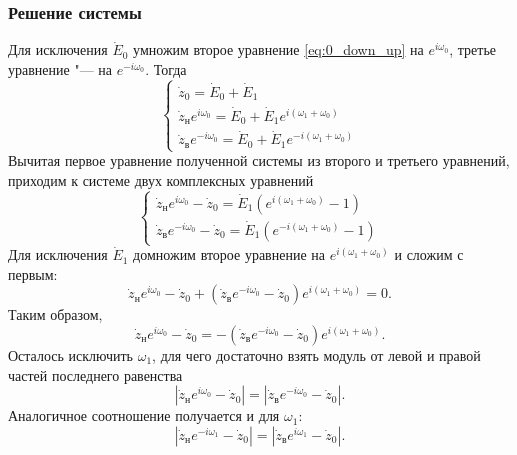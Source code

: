 \documentclass[../main.tex]{subfiles}
\begin{document}
\subsubsection{Решение системы}
Для исключения $\dot{E}_0$ умножим второе уравнение \eqref{eq:0_down_up} на $e^{i\omega_0}$, третье уравнение "--- на $e^{-i\omega_0}$. Тогда
\begin{equation*}
  \begin{cases}
    \dot{z}_0 = \dot{E}_0 + \dot{E}_1 \\
    \dot{z}_\text{н} e^{ i\omega_0} = \dot{E}_0 + \dot{E}_1 e^{ i \left(\omega_1 + \omega_0 \right)} \\
    \dot{z}_\text{в} e^{-i\omega_0} = \dot{E}_0 + \dot{E}_1 e^{-i \left(\omega_1 + \omega_0\right)}
  \end{cases}
\end{equation*}
Вычитая первое уравнение полученной системы из второго и третьего уравнений, приходим к системе двух комплексных уравнений
\begin{equation*}
  \begin{cases}
    \dot{z}_\text{н} e^{ i\omega_0} - \dot{z}_0 = \dot{E}_1 \left( e^{ i\left(\omega_1 + \omega_0 \right)} - 1\right) \\
    \dot{z}_\text{в} e^{-i\omega_0} - \dot{z}_0 = \dot{E}_1 \left( e^{-i\left(\omega_1 + \omega_0 \right)} - 1 \right)
  \end{cases}
\end{equation*}
Для исключения $\dot{E}_1$ домножим второе уравнение на $e^{i \left(\omega_1 + \omega_0 \right)}$ и сложим с первым:
\begin{equation*}
  \dot{z}_\text{н} e^{i\omega_0} - \dot{z}_0 + \left(\dot{z}_\text{в} e^{-i\omega_0} - \dot{z}_0 \right) e^{i \left(\omega_1 + \omega_0 \right)} = 0.
\end{equation*}
Таким образом,
\begin{equation*}
  \dot{z}_\text{н} e^{i\omega_0} - \dot{z}_0 = -\left(\dot{z}_\text{в} e^{-i\omega_0} - \dot{z}_0 \right) e^{i\left(\omega_1+\omega_0\right)}.
\end{equation*}
Осталось исключить $\omega_1$, для чего достаточно взять модуль от левой и правой частей последнего равенства
\begin{equation} \label{eq:w_0}
  \left|\dot{z}_\text{н} e^{i\omega_0} - \dot{z}_0 \right| = \left|\dot{z}_\text{в} e^{-i\omega_0} - \dot{z}_0\right|.
\end{equation}
Аналогичное соотношение получается и для $\omega_1$:
\begin{equation} \label{eq:w_1}
  \left|\dot{z}_\text{н} e^{-i\omega_1} - \dot{z}_0 \right| = \left|\dot{z}_\text{в} e^{i\omega_1} - \dot{z}_0 \right|.
\end{equation}
\end{document}
